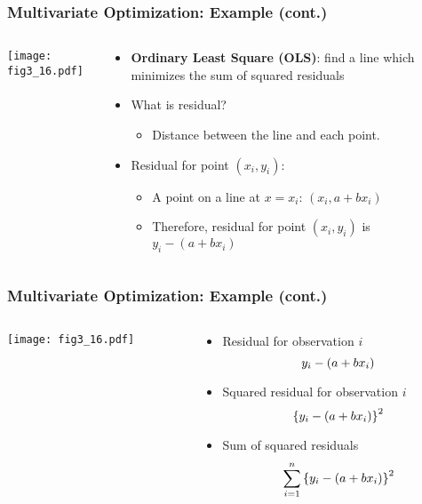 \documentclass[pdflatex, 12pt]{beamer}
\begin{document}
\begin{frame}
\frametitle{Multivariate Optimization: Example (cont.)}
\begin{columns}
\begin{column}{0.5\textwidth}
\centering
\texttt{[image: fig3\_16.pdf]}
\end{column}
\begin{column}{0.5\textwidth}
\begin{itemize}
\item \textbf{Ordinary Least Square (OLS)}: find a line which minimizes the sum of squared residuals
\vspace{0.4cm}
\item What is residual?
 \begin{itemize}
 \item Distance between the line and each point.
 \end{itemize}
\vspace{0.4cm}
\item Residual for point $(x_i, y_i)$:
 \begin{itemize}
 \item A point on a line at $x = x_i$: $(x_i, a + bx_i)$
 \item Therefore, residual for point $(x_i, y_i)$ is $y_i - (a + bx_i)$
 \end{itemize}
\end{itemize}
\end{column}
\end{columns}
\end{frame}

\begin{frame}
\frametitle{Multivariate Optimization: Example (cont.)}
\begin{columns}
\begin{column}{0.5\textwidth}
\centering
\texttt{[image: fig3\_16.pdf]}
\end{column}
\begin{column}{0.5\textwidth}
\begin{itemize}
\item Residual for observation $i$
 \begin{equation}
 y_i - (a + bx_i) \notag
 \end{equation}
\item Squared residual for observation $i$
 \begin{equation}
 \left\{y_i - (a + bx_i)\right\}^2 \notag
 \end{equation}
\item Sum of squared residuals
 \begin{equation}
 \sum_{i = 1}^{n} \left\{y_i - (a + bx_i)\right\}^2 \notag
 \end{equation}
\end{itemize}
\end{column}
\end{columns}
\end{frame}
\end{document}
